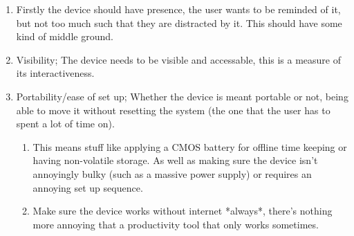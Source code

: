 \begin{enumerate}
\item Firstly the device should have presence, the user wants to be reminded of it, but not too much such that they are distracted by it. This should have some kind of middle ground.
\item Visibility; The device needs to be visible and accessable, this is a measure of its interactiveness.
\item Portability/ease of set up; Whether the device is meant portable or not, being able to move it without resetting the system (the one that the user has to spent a lot of time on).
    \begin{enumerate}
      \item This means stuff like applying a CMOS battery for offline time keeping or having non-volatile storage. As well as making sure the device isn't annoyingly bulky (such as a massive power supply) or requires an annoying set up sequence.
      \item Make sure the device works without internet *always*, there's nothing more annoying that a productivity tool that only works sometimes.
    \end{enumerate}
\end{enumerate}

